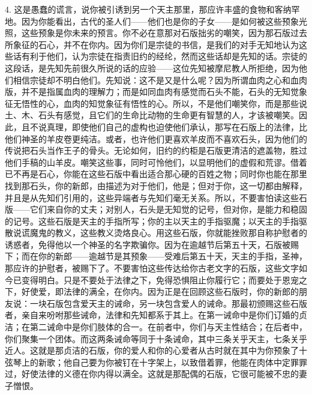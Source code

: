 4. 这是愚蠢的谎言，说你被引诱到另一个天主那里，那应许丰盛的食物和客纳罕地。因为你能看出，古代的圣人们——他们也是你的子女——是如何被这些预象光照，这些预象是你未来的预言。你不必在意那对石版拙劣的嘲笑，因为那石版过去所象征的石心，并不在你内。因为你们是宗徒的书信，是我们的对手无知地认为这些话有利于他们，认为宗徒在指责旧约的经纶，然而这些话却是先知的话。宗徒的这段话，是先知先前很久所说的话的应验——这位先知被摩尼教人所拒绝，因为他们相信宗徒却不明白他们。先知说：这不是又是什么呢？因为所谓血肉之心和血肉版，并不是指属血肉的理解力；而是如同血肉有感觉而石头不能，石头的无知觉象征无悟性的心，血肉的知觉象征有悟性的心。所以，不是他们嘲笑你，而是那些说土、木、石头有感觉，且它们的生命比动物的生命更有智慧的人，才该被嘲笑。因此，且不说真理，即使他们自己的虚构也迫使他们承认，那写在石版上的法律，比他们神圣的羊皮卷更纯洁。或者，也许他们更喜欢羊皮而不喜欢石头，因为他们的传说把石头当作王子的骨头。无论如何，旧约的约柜是石版更清洁的遮盖物，胜过他们手稿的山羊皮。嘲笑这些事，同时可怜他们，以显明他们的虚假和荒谬。借着已不再是石心，你能在这些石版中看出适合那心硬的百姓之物；同时你也能在那里找到那石头，你的新郎，由描述为对于他们，他是；但对于你，这一切都由解释，并且是从先知们引用的，这些异端者与先知们毫无关系。所以，不要害怕读这些石版——它们来自你的丈夫；对别人，石头是无知觉的记号，但对你，是能力和稳固的记号。这些石版是天主的手指所写；你的主以天主的手指驱魔；以天主的手指驱散说谎魔鬼的教义，这些教义烫烙良心。用这些石版，你就能挫败那自称护慰者的诱惑者，免得他以一个神圣的名字欺骗你。因为在逾越节后第五十天，石版被赐下；而在你的新郎——逾越节是其预象——受难后第五十天，天主的手指，圣神，那应许的护慰者，被赐下了。不要害怕这些传达给你古老文字的石版，这些文字如今已变得明白。只是不要处于法律之下，免得恐惧阻止你履行它；而要处于恩宠之下，好使爱，即法律的满全，在你内。因为正是在回顾这些石版时，你的新郎的朋友说：一块石版包含爱天主的诫命，另一块包含爱人的诫命。那最初颁赐这些石版者，亲自来吩咐那些诫命，法律和先知都系于其上。在第一诫命中是你们订婚的贞洁；在第二诫命中是你们肢体的合一。在前者中，你们与天主性结合；在后者中，你们聚集一个团体。而这两条诫命等同于十条诫命，其中三条关乎天主，七条关乎近人。这就是那贞洁的石版，你的爱人和你的心爱者从古时就在其中为你预象了十弦琴上的新歌；他自己要为你被钉在十字架上，以致借着罪，他能在肉体中定罪罪过，好使法律的义德在你内得以满全。这就是那配偶的石版，它很可能被不忠的妻子憎恨。\par

